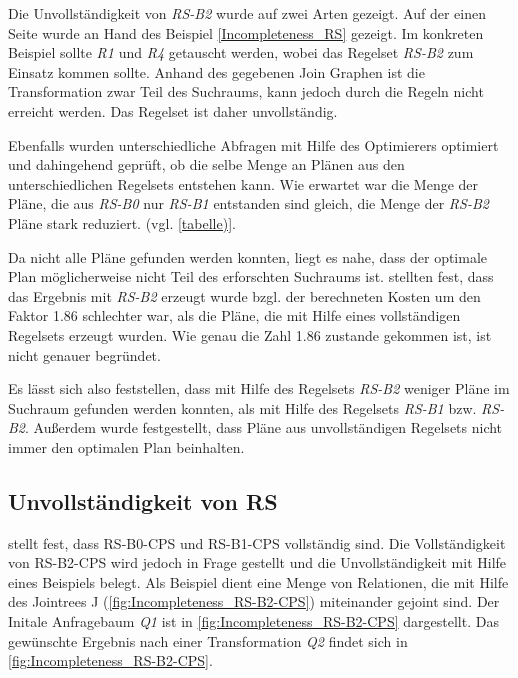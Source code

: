 Die Unvollständigkeit von \textit{RS-B2} wurde auf zwei Arten gezeigt. Auf der einen Seite wurde an Hand des Beispiel \ref{Incompleteness_RS} gezeigt. Im konkreten Beispiel sollte \textit{R1} und \textit{R4} getauscht werden, wobei das Regelset \textit{RS-B2} zum Einsatz kommen sollte. Anhand des gegebenen Join Graphen ist die Transformation zwar Teil des Suchraums, kann jedoch durch die Regeln nicht erreicht werden. Das Regelset ist daher unvollständig.

Ebenfalls wurden unterschiedliche Abfragen mit Hilfe des Optimierers optimiert und dahingehend geprüft, ob die selbe Menge an Plänen aus den unterschiedlichen Regelsets entstehen kann. Wie erwartet war die Menge der Pläne, die aus \textit{RS-B0} nur \textit{RS-B1} entstanden sind gleich, die Menge der \textit{RS-B2} Pläne stark reduziert. (vgl. \ref{tabelle)}.

Da nicht alle Pläne gefunden werden konnten, liegt es nahe, dass der optimale Plan möglicherweise nicht Teil des erforschten Suchraums ist. \cite{shanbhag2014optimizing} stellten fest, dass das Ergebnis mit \textit{RS-B2} erzeugt wurde bzgl. der berechneten Kosten um den Faktor 1.86 schlechter war, als die Pläne, die mit Hilfe eines vollständigen Regelsets erzeugt wurden. Wie genau die Zahl 1.86 zustande gekommen ist, ist nicht genauer begründet.

Es lässt sich also feststellen, dass mit Hilfe des Regelsets \textit{RS-B2} weniger Pläne im Suchraum gefunden werden konnten, als mit Hilfe des Regelsets \textit{RS-B1} bzw. \textit{RS-B2}. Außerdem wurde festgestellt, dass Pläne aus unvollständigen Regelsets nicht immer den optimalen Plan beinhalten.





\subsection{Unvollständigkeit von RS}




\cite{shanbhag2014optimizing} stellt fest, dass RS-B0-CPS und RS-B1-CPS vollständig sind. Die Vollständigkeit von RS-B2-CPS wird jedoch in Frage gestellt und die Unvollständigkeit mit Hilfe eines Beispiels belegt. Als Beispiel dient eine Menge von Relationen, die mit Hilfe des Jointrees J (\ref{fig:Incompleteness_RS-B2-CPS}) miteinander gejoint sind. Der Initale Anfragebaum \textit{Q1} ist in \ref{fig:Incompleteness_RS-B2-CPS} dargestellt. Das gewünschte Ergebnis nach einer Transformation \textit{Q2}  findet sich in \ref{fig:Incompleteness_RS-B2-CPS}. 

